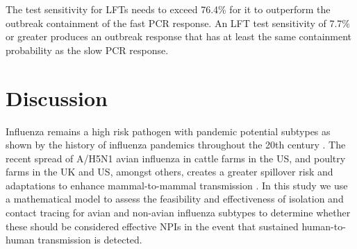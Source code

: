 \documentclass{article}
\begin{document}
The test sensitivity for LFTs needs to exceed 76.4\% for it to outperform the outbreak containment of the fast PCR response. An LFT test sensitivity of 7.7\% or greater produces an outbreak response that has at least the same containment probability as the slow PCR response.

\clearpage

\section*{Discussion}

Influenza remains a high risk pathogen with pandemic potential subtypes as shown by the history of influenza pandemics throughout the 20th century \citep{saunders-hastingsReviewingHistoryPandemic2016}. The recent spread of A/H5N1 avian influenza in cattle farms in the US, and poultry farms in the UK and US, amongst others, creates a greater spillover risk and adaptations to enhance mammal-to-mammal transmission \citep{linSingleMutationBovine2024, gargHighlyPathogenicAvian2025, peacockGlobalH5N1Influenza2025}. In this study we use a mathematical model to assess the feasibility and effectiveness of isolation and contact tracing for avian and non-avian influenza subtypes to determine whether these should be considered effective NPIs in the event that sustained human-to-human transmission is detected. \\
\end{document}
